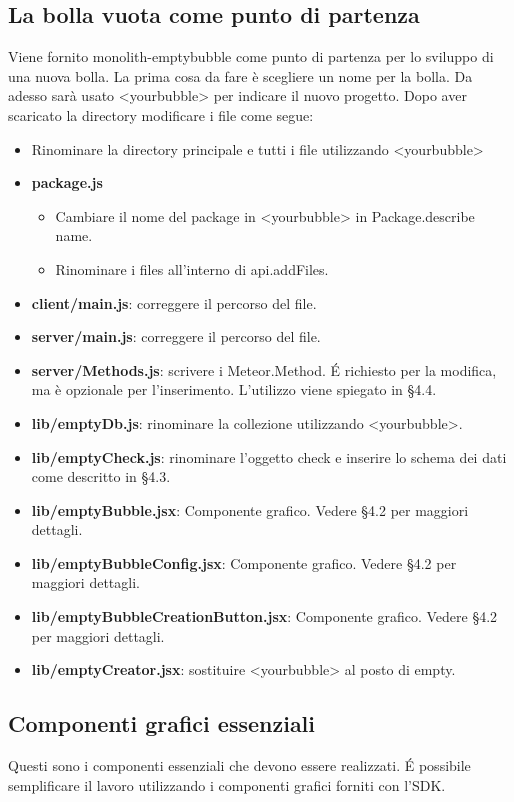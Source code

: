 \subsection{La bolla vuota come punto di partenza}
Viene fornito monolith-emptybubble come punto di partenza per lo sviluppo di una nuova bolla. La prima cosa da fare è scegliere un nome per la bolla. Da adesso sarà usato <yourbubble> per indicare il nuovo progetto. Dopo aver scaricato la directory modificare i file come segue:
\begin{itemize}
	\item Rinominare la directory principale e tutti i file utilizzando <yourbubble>
	\item \textbf{package.js}
		\begin{itemize}
			\item Cambiare il nome del package  in <yourbubble> in Package.describe name.
			\item Rinominare i files all'interno di api.addFiles. 
		\end{itemize}
	\item \textbf{client/main.js}: correggere il percorso del file.
	\item \textbf{server/main.js}: correggere il percorso del file.
	\item \textbf{server/Methods.js}: scrivere i Meteor.Method. \'E richiesto per la modifica, ma è opzionale per l'inserimento. L'utilizzo viene spiegato in \S 4.4.
	\item \textbf{lib/emptyDb.js}: rinominare la collezione utilizzando <yourbubble>.
	\item \textbf{lib/emptyCheck.js}: rinominare l'oggetto check e inserire lo schema dei dati come descritto in \S 4.3.
	\item \textbf{lib/emptyBubble.jsx}: Componente grafico. Vedere \S 4.2 per maggiori dettagli.
	\item \textbf{lib/emptyBubbleConfig.jsx}: Componente grafico. Vedere \S 4.2 per maggiori dettagli.	
	\item \textbf{lib/emptyBubbleCreationButton.jsx}: Componente grafico. Vedere \S 4.2 per maggiori dettagli.
	\item \textbf{lib/emptyCreator.jsx}: sostituire <yourbubble> al posto di empty.
		
\end{itemize}

\subsection{Componenti grafici essenziali}
Questi sono i componenti essenziali che devono essere realizzati. \'E possibile semplificare il lavoro utilizzando i componenti grafici forniti con l'SDK.
